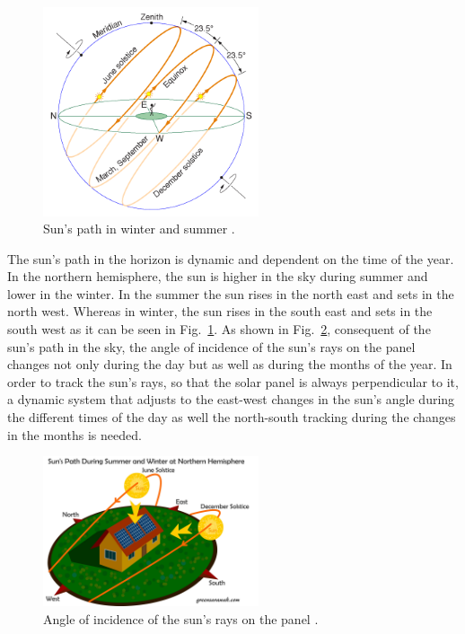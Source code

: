 \documentclass[conference]{IEEEtran}
\begin{document}
\begin{figure}[htbp]
	\includegraphics[width=2.5in]{img/SunsPath1.png}
	\centering
    \captionsetup{justification=centering}
	\caption{Sun's path in winter and summer \cite{b1}.}
	\label{fig:SunsPath1}
\end{figure}

The sun's path in the horizon is dynamic and dependent on the time of the year. In the northern hemisphere, the sun is higher in the sky during summer and lower in the winter. In the summer the sun rises in the north east and sets in the north west. Whereas in winter, the sun rises in the south east and sets in the south west as it can be seen in Fig.~\ref{fig:SunsPath1}. As shown in Fig.~\ref{fig:SunsPath2}, consequent of the sun's path in the sky, the angle of incidence of the sun's rays on the panel changes not only during the day but as well as during the months of the year. In order to track the sun's rays, so that the solar panel is always perpendicular to it, a dynamic system that adjusts to the east-west changes in the sun's angle during the different times of the day as well the north-south tracking during the changes in the months is needed.

\begin{figure}[htbp]
    \includegraphics[width=2.5in]{img/SunsPath2.png}
    \centering
    \captionsetup{justification=centering}
    \caption{Angle of incidence of the sun's rays on the panel \cite{b2}.}
    \label{fig:SunsPath2}
\end{figure}
\end{document}
